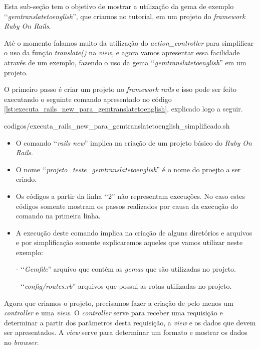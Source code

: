 Esta sub-seção tem o objetivo de mostrar a utilização da gema de exemplo ‘‘\emph{gemtranslatetoenglish}'',
que criamos no tutorial, em um projeto do \emph{framework Ruby On Rails}.

Até o momento falamos muito da utilização do \emph{action\_controller} para simplificar o uso da função
\emph{translate()} na \emph{view}, e agora vamos apresentar essa facilidade através de um exemplo,
fazendo o uso da gema ‘‘\emph{gemtranslatetoenglish}'' em um projeto.

O primeiro passo é criar um projeto no \emph{framework rails} e isso pode ser feito executando
o seguinte comando apresentado no código \ref{lst:executa_rails_new_para_gemtranslatetoenglish},
explicado logo a seguir.


{codigos/executa_rails_new_para_gemtranslatetoenglish_simplificado.sh}

\begin{itemize}

 \item O comando ‘‘\emph{rails new}'' implica na criação de um projeto básico do \emph{Ruby On Rails}.

 \item O nome ‘‘\emph{projeto\_teste\_gemtranslatetoenglish}'' é o nome do proejto a ser criado.

  \item Os códigos a partir da linha ‘‘2'' não representam execuções. No caso estes códigos somente
 mostram os passos realizados por causa da execução do comando na primeira linha.

 \item A execução deste comando implica na criação de alguns diretórios e arquivos e por simplificação
 somente explicaremos aqueles que vamos utilizar neste exemplo:

  \subitem - ‘‘\emph{Gemfile}'' arquivo que contém as \emph{gemas} que são utilizadas no projeto.

  \subitem - ‘‘\emph{config/routes.rb}'' arquivos que possui as rotas utilizadas no projeto.

\end{itemize}

Agora que criamos o projeto, precisamos fazer a criação de pelo menos um \emph{controller} e uma \emph{view}.
O \emph{controller} serve para receber uma requisição e determinar a partir dos parâmetros desta
requisição, a \emph{view} e os dados que devem ser apresentados. A \emph{view} serve para
determinar um formato e mostrar os dados no \emph{browser}.

